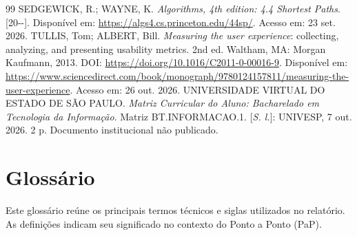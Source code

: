\documentclass[12pt,oneside,a4paper,brazil,chapter=TITLE]{abntex2}
\begin{document}
\begin{thebibliography}{99}
 SEDGEWICK, R.; WAYNE, K. \textit{Algorithms, 4th edition: 4.4 Shortest Paths}. [20\mbox{-}\mbox{-}]. Disponível em: \url{https://algs4.cs.princeton.edu/44sp/}. Acesso em: 23 set. 2026.
 TULLIS, Tom; ALBERT, Bill. \textit{Measuring the user experience}: collecting, analyzing, and presenting usability metrics. 2nd ed. Waltham, MA: Morgan Kaufmann, 2013. DOI: \url{https://doi.org/10.1016/C2011-0-00016-9}. Disponível em: \url{https://www.sciencedirect.com/book/monograph/9780124157811/measuring-the-user-experience}. Acesso em: 26 out. 2026.
 UNIVERSIDADE VIRTUAL DO ESTADO DE SÃO PAULO. \textit{Matriz Curricular do Aluno: Bacharelado em Tecnologia da Informação}. Matriz BT.INFORMACAO.1. [\textit{S. l.}]: UNIVESP, 7 out. 2026. 2 p. Documento institucional não publicado.
\end{thebibliography}


\chapter*{Glossário}
\label{sec:glossario}
Este glossário reúne os principais termos técnicos e siglas utilizados no relatório. As definições indicam seu significado no contexto do Ponto a Ponto (PaP).
\end{document}
